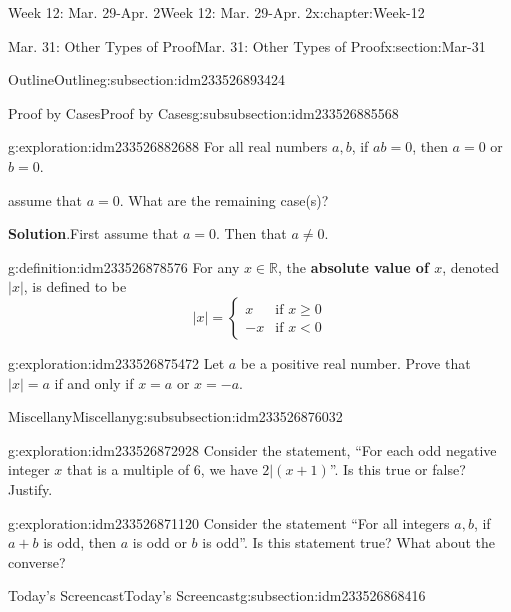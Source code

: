 \documentclass[oneside,10pt,]{book}
\newcommand{\blocktitlefont}{\relax}
\newcommand{\terminology}[1]{\textbf{#1}}
\numberwithin{equation}{section}
\renewcommand{\ge}{\geqslant}
\def\R{{\mathbb R}}
\newcommand{\R}{\mathbb R}
\newcommand{\lt}{<}
\newcommand{\amp}{&}
\begin{document}
\begin{chapterptx}{Week 12: Mar. 29-Apr. 2}{}{Week 12: Mar. 29-Apr. 2}{}{}{x:chapter:Week-12}
\begin{sectionptx}{Mar. 31: Other Types of Proof}{}{Mar. 31: Other Types of Proof}{}{}{x:section:Mar-31}
\begin{subsectionptx}{Outline}{}{Outline}{}{}{g:subsection:idm233526893424}
\begin{subsubsectionptx}{Proof by Cases}{}{Proof by Cases}{}{}{g:subsubsection:idm233526885568}
\begin{exploration}{}{g:exploration:idm233526882688}
For all real numbers \(a,b\), if \(ab=0\), then \(a=0\) or \(b=0\).%
\par\smallskip%
\noindentFirst assume that \(a=0\). What are the remaining case(s)?\par\smallskip%
\noindent\textbf{\blocktitlefont Solution}.\hypertarget{g:solution:idm233526879760}{}\quad{}First assume that \(a=0\). Then that \(a\ne 0\).%
\end{exploration}%
\begin{definition}{}{g:definition:idm233526878576}%
%
For any \(x\in\R\), the \terminology{absolute value of \(x\)}, denoted \(|x|\), is defined to be%
\begin{equation*}
|x| = \begin{cases} x \amp \text{if } x\ge 0\\ -x \amp \text{if } x\lt 0\end{cases}
\end{equation*}
%
\end{definition}
\begin{exploration}{}{g:exploration:idm233526875472}%
Let \(a\) be a positive real number. Prove that \(|x| = a\) if and only if \(x=a\) or \(x=-a\).%
\end{exploration}%
\end{subsubsectionptx}
%
%
\typeout{************************************************}
\typeout{************************************************}
%
\begin{subsubsectionptx}{Miscellany}{}{Miscellany}{}{}{g:subsubsection:idm233526876032}
\begin{exploration}{}{g:exploration:idm233526872928}%
Consider the statement, ``For each odd negative integer \(x\) that is a multiple of 6, we have \(2|(x+1)\)''. Is this true or false? Justify.%
\end{exploration}%
\begin{exploration}{}{g:exploration:idm233526871120}%
Consider the statement ``For all integers \(a,b\), if \(a+b\) is odd, then \(a\) is odd or \(b\) is odd''. Is this statement true? What about the converse?%
\end{exploration}%
\end{subsubsectionptx}
\end{subsectionptx}
%
%
\typeout{************************************************}
\typeout{************************************************}
%
\begin{subsectionptx}{Today's Screencast}{}{Today's Screencast}{}{}{g:subsection:idm233526868416}

\end{subsectionptx}
\end{sectionptx}
\end{chapterptx}
\end{document}
